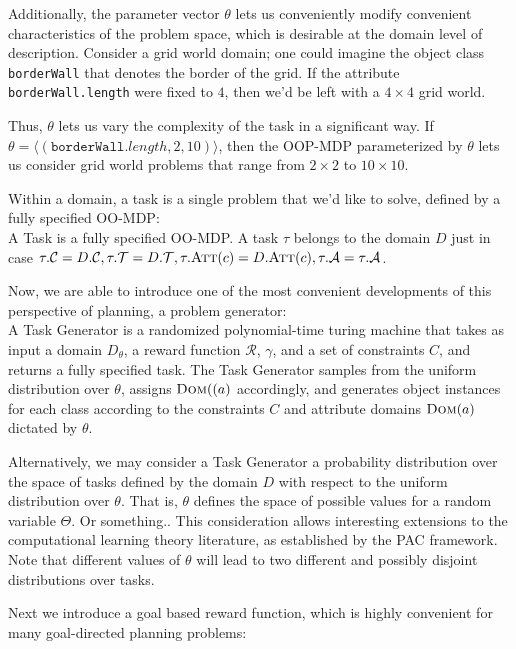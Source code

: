 \documentclass[11pt]{article}
\begin{document}
Additionally, the parameter vector $\theta$ lets us conveniently modify convenient characteristics of the problem space, which is desirable at the domain level of description. Consider a grid world domain; one could imagine the object class \texttt{borderWall} that denotes the border of the grid. If the attribute \texttt{borderWall.length} were fixed to $4$, then we'd be left with a $4\times4$ grid world.

Thus, $\theta$ lets us vary the complexity of the task in a significant way. If $\theta = \langle (\texttt{borderWall}.length,2,10) \rangle$, then the OOP-MDP parameterized by $\theta$ lets us consider grid world problems that range from $2\times2$ to $10\times10$.

Within a domain, a task is a single problem that we'd like to solve, defined by a fully specified OO-MDP: \\

{ A \textup{Task} is a fully specified OO-MDP. A task $\tau$ belongs to the domain $D$ just in case $\tau.\mathcal{C} = D.\mathcal{C}, \tau.\mathcal{T} = D.\mathcal{T}, \tau.\textsc{Att}(c) = D.\textsc{Att}(c), \tau.\mathcal{A} = \tau.\mathcal{A}$}.


Now, we are able to introduce one of the most convenient developments of this perspective of planning, a problem generator: \\

{ A \textup{Task Generator} is a randomized polynomial-time turing machine that takes as input a domain $D_\theta$, a reward function $\mathcal{R}$, $\gamma$, and a set of constraints $C$, and returns a fully specified task. The Task Generator samples from the uniform distribution over $\theta$, assigns $\textsc{Dom}((a)$ accordingly, and generates object instances for each class according to the constraints $C$ and attribute domains $\textsc{Dom}(a)$ dictated by $\theta$.}

Alternatively, we may consider a Task Generator a probability distribution over the space of tasks defined by the domain $D$ with respect to the uniform distribution over $\theta$. That is, $\theta$ defines the space of possible values for a random variable $\Theta$. Or something.. This consideration allows interesting extensions to the computational learning theory literature, as established by the PAC framework. Note that different values of $\theta$ will lead to two different and possibly disjoint distributions over tasks.


Next we introduce a goal based reward function, which is highly convenient for many goal-directed planning problems: \\
\end{document}
